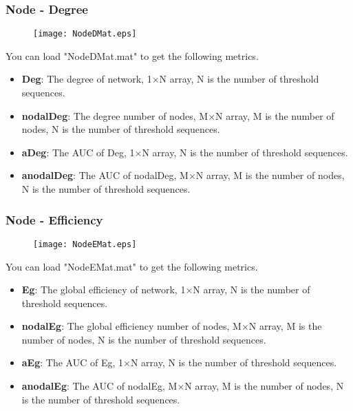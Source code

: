 \documentclass[11pt]{article}
\begin{document}
			\subsubsection{Node - Degree}
				\begin{figure}
					\begin{center}
						\texttt{[image: NodeDMat.eps]}
					\end{center}
				\end{figure}
				You can load "NodeDMat.mat" to get the following metrics.
				\begin{itemize}
					\item \textbf{Deg}: The degree of network,
						1$\times$N array, N is the number of threshold sequences.
					\item \textbf{nodalDeg}: The degree number of nodes,
						M$\times$N array, M is the number of nodes, N is the number of threshold sequences.
					\item \textbf{aDeg}: The AUC of Deg,
						1$\times$N array, N is the number of threshold sequences.
					\item \textbf{anodalDeg}: The AUC of nodalDeg,
						M$\times$N array, M is the number of nodes, N is the number of threshold sequences.
				\end{itemize}
			\subsubsection{Node - Efficiency}
				\begin{figure}
					\begin{center}
						\texttt{[image: NodeEMat.eps]}
					\end{center}
				\end{figure}
				You can load "NodeEMat.mat" to get the following metrics.
				\begin{itemize}
					\item \textbf{Eg}: The global efficiency of network,
						1$\times$N array, N is the number of threshold sequences.
					\item \textbf{nodalEg}: The global efficiency number of nodes,
						M$\times$N array, M is the number of nodes, N is the number of threshold sequences.
					\item \textbf{aEg}: The AUC of Eg,
						1$\times$N array, N is the number of threshold sequences.
					\item \textbf{anodalEg}: The AUC of nodalEg,
						M$\times$N array, M is the number of nodes, N is the number of threshold sequences.
				\end{itemize}
\end{document}
